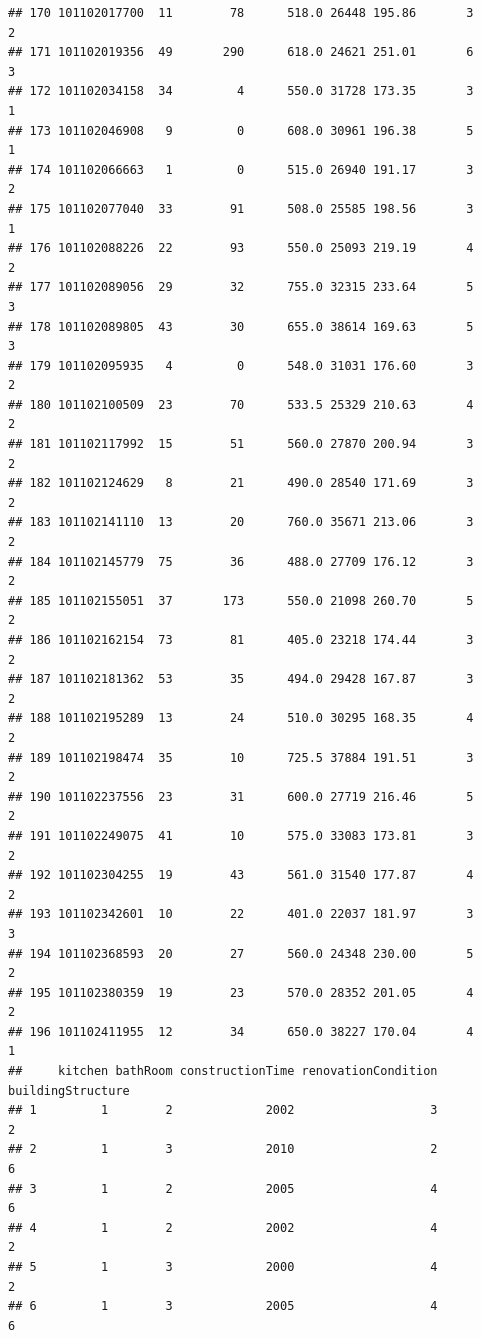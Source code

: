 \documentclass[
]{article}
\begin{document}
\begin{verbatim}
## 170 101102017700  11        78      518.0 26448 195.86       3          2
## 171 101102019356  49       290      618.0 24621 251.01       6          3
## 172 101102034158  34         4      550.0 31728 173.35       3          1
## 173 101102046908   9         0      608.0 30961 196.38       5          1
## 174 101102066663   1         0      515.0 26940 191.17       3          2
## 175 101102077040  33        91      508.0 25585 198.56       3          1
## 176 101102088226  22        93      550.0 25093 219.19       4          2
## 177 101102089056  29        32      755.0 32315 233.64       5          3
## 178 101102089805  43        30      655.0 38614 169.63       5          3
## 179 101102095935   4         0      548.0 31031 176.60       3          2
## 180 101102100509  23        70      533.5 25329 210.63       4          2
## 181 101102117992  15        51      560.0 27870 200.94       3          2
## 182 101102124629   8        21      490.0 28540 171.69       3          2
## 183 101102141110  13        20      760.0 35671 213.06       3          2
## 184 101102145779  75        36      488.0 27709 176.12       3          2
## 185 101102155051  37       173      550.0 21098 260.70       5          2
## 186 101102162154  73        81      405.0 23218 174.44       3          2
## 187 101102181362  53        35      494.0 29428 167.87       3          2
## 188 101102195289  13        24      510.0 30295 168.35       4          2
## 189 101102198474  35        10      725.5 37884 191.51       3          2
## 190 101102237556  23        31      600.0 27719 216.46       5          2
## 191 101102249075  41        10      575.0 33083 173.81       3          2
## 192 101102304255  19        43      561.0 31540 177.87       4          2
## 193 101102342601  10        22      401.0 22037 181.97       3          3
## 194 101102368593  20        27      560.0 24348 230.00       5          2
## 195 101102380359  19        23      570.0 28352 201.05       4          2
## 196 101102411955  12        34      650.0 38227 170.04       4          1
##     kitchen bathRoom constructionTime renovationCondition buildingStructure
## 1         1        2             2002                   3                 2
## 2         1        3             2010                   2                 6
## 3         1        2             2005                   4                 6
## 4         1        2             2002                   4                 2
## 5         1        3             2000                   4                 2
## 6         1        3             2005                   4                 6

\end{verbatim}
\end{document}
